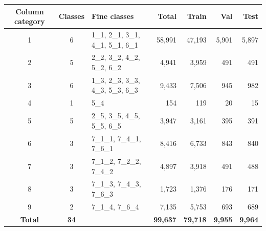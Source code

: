 \begin{tabular}{cclrrrr}
\toprule
\textbf{Column category} & \textbf{Classes} & \textbf{Fine classes} & \textbf{Total} & \textbf{Train} & \textbf{Val} & \textbf{Test} \\
\midrule
1 & 6 & 1\_1, 2\_1, 3\_1, 4\_1, 5\_1, 6\_1 & 58,991 & 47,193 & 5,901 & 5,897 \\
2 & 5 & 2\_2, 3\_2, 4\_2, 5\_2, 6\_2 & 4,941 & 3,959 & 491 & 491 \\
3 & 6 & 1\_3, 2\_3, 3\_3, 4\_3, 5\_3, 6\_3 & 9,433 & 7,506 & 945 & 982 \\
4 & 1 & 5\_4 & 154 & 119 & 20 & 15 \\
5 & 5 & 2\_5, 3\_5, 4\_5, 5\_5, 6\_5 & 3,947 & 3,161 & 395 & 391 \\
6 & 3 & 7\_1\_1, 7\_4\_1, 7\_6\_1 & 8,416 & 6,733 & 843 & 840 \\
7 & 3 & 7\_1\_2, 7\_2\_2, 7\_4\_2 & 4,897 & 3,918 & 491 & 488 \\
8 & 3 & 7\_1\_3, 7\_4\_3, 7\_6\_3 & 1,723 & 1,376 & 176 & 171 \\
9 & 2 & 7\_1\_4, 7\_6\_4 & 7,135 & 5,753 & 693 & 689 \\
\midrule
\textbf{Total} & \textbf{34} &  & \textbf{99,637} & \textbf{79,718} & \textbf{9,955} & \textbf{9,964} \\
\bottomrule
\end{tabular}
